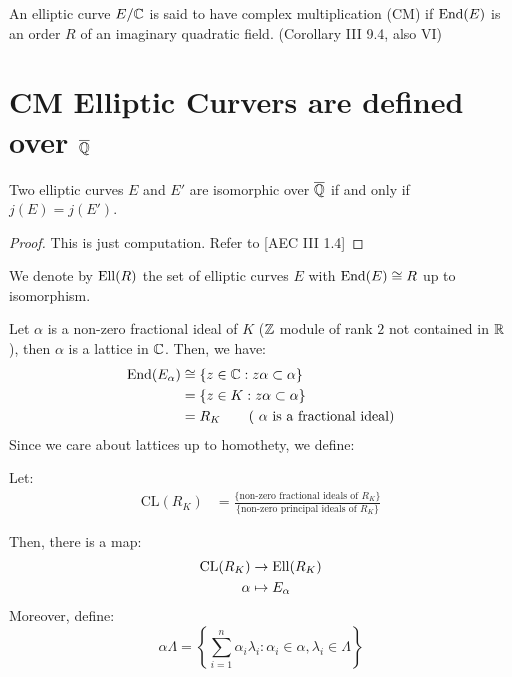 \documentclass[12pt]{article}
\begin{document}
\begin{definition}
    An elliptic curve $E/\mathbb C$ is said to have complex multiplication (CM) if $\operatorname{End}(E)$ is an order $R$ of an imaginary quadratic field. (Corollary III 9.4, also VI)
\end{definition}

\newpage


\section{CM Elliptic Curvers are defined over $\overline{\mathbb Q}$}
\begin{prop}
    Two elliptic curves $E$ and $E'$ are isomorphic over $\overline {\mathbb Q}$ if and only if $j(E) = j(E')$.
\end{prop}
\begin{proof}
    This is just computation. Refer to [AEC III 1.4]
\end{proof}


\begin{definition}
    We denote by $\operatorname{Ell}(R)$ the set of elliptic curves $E$ with $\operatorname{End}(E) \cong R$ up to isomorphism.
\end{definition}

Let $\alpha$ is a non-zero fractional ideal of $K$ ($\mathbb Z$ module of rank $2$ not contained in $\mathbb R$), then $\alpha$ is a lattice in $\mathbb C$. Then, we have:
\begin{align*}
    \operatorname{End}(E_\alpha) &\cong \{ z \in \mathbb C : z\alpha \subset \alpha \} \\
    &= \{ z \in K : z\alpha \subset \alpha \} \\
    &= R_K \qquad (\text{ $\alpha$ is a fractional ideal})
\end{align*}
Since we care about lattices up to homothety, we define: 
\begin{definition}
    Let:
    \begin{align*}
        \text{CL}(R_K) &= \frac{\{ \text{non-zero fractional ideals of } R_K \}}{ \{\text{non-zero principal ideals of $R_K$}\}}
    \end{align*}
\end{definition}

Then, there is a map: 
\begin{align*}
    \text{CL}(R_K) &\to \operatorname{Ell}(R_K) \\
    \alpha &\mapsto E_\alpha
\end{align*}
Moreover, define: 
\[\alpha\Lambda = \left\{\sum_{i=1}^n\alpha_i\lambda_i : \alpha_i \in \alpha, \lambda_i \in \Lambda\right\}\]
\end{document}
